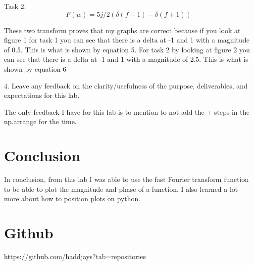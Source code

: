 \documentclass[11pt,a4]{report}
\begin{document}
Task 2:
\begin{equation}
F(w) = 5j/2(\delta(f-1)-\delta(f+1))    
\end{equation}

These two transform proves that my graphs are correct because if you look at figure 1 for task 1 you can see that there is a delta at -1 and 1 with a magnitude of 0.5. This is what is shown by equation 5. For task 2 by looking at figure 2 you can see that there is a delta at -1 and 1 with a magnitude of 2.5. This is what is shown by equation 6

4. Leave any feedback on the clarity/usefulness of the purpose, deliverables, and expectations
for this lab.

The only feedback I have for this lab is to mention to not add the + steps in the np.arrange for the time.  

\section{Conclusion}
In conclusion, from this lab I was able to use the fast Fourier transform function to be able to plot the magnitude and phase of a function. I also learned a lot more about how to position plots on python. 


\section{Github}
https://github.com/haddjays?tab=repositories
\end{document}
